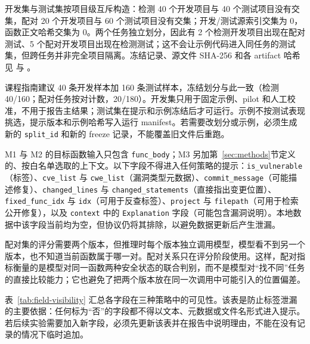 \documentclass[conference]{IEEEtran}
\begin{document}
开发集与测试集按项目级互斥构造：检测 40 个开发项目与 40 个测试项目没有交集，配对 20 个开发项目与 60 个测试项目没有交集；开发/测试源索引交集为 0，函数正文哈希交集为 0。两个任务独立划分，因此有 2 个检测开发项目出现在配对测试、5 个配对开发项目出现在检测测试；这不会让示例代码进入同任务的测试集，但跨任务并非完全项目隔离。冻结记录、源文件 SHA-256 和各 artifact 哈希见  与 。

课程指南建议 40 条开发样本加 160 条测试样本，冻结划分与此一致（检测 40/160；配对任务按对计数，20/180）。开发集只用于固定示例、pilot 和人工校准，不用于报告主结果；测试集在提示和示例冻结后才可运行。示例不按测试表现挑选，提示版本和示例哈希写入运行 manifest。若需要改划分或示例，必须生成新的 \texttt{split\_id} 和新的 freeze 记录，不能覆盖旧文件后重跑。

M1 与 M2 的目标函数输入只包含 \texttt{func\_body}；M3 另加第~\ref{sec:methods}节定义的、按白名单选取的上下文。以下字段不得进入任何策略的提示：\texttt{is\_vulnerable}（标签）、\texttt{cve\_list} 与 \texttt{cwe\_list}（漏洞类型元数据）、\texttt{commit\_message}（可能描述修复）、\texttt{changed\_lines} 与 \texttt{changed\_statements}（直接指出变更位置）、\texttt{fixed\_func\_idx} 与 \texttt{idx}（可用于反查标签）、\texttt{project} 与 \texttt{filepath}（可用于检索公开修复），以及 \texttt{context} 中的 \texttt{Explanation} 字段（可能包含漏洞说明）。本地数据中该字段当前均为空，但协议仍将其排除，以避免数据更新后产生泄漏。

配对集的评分需要两个版本，但推理时每个版本独立调用模型，模型看不到另一个版本，也不知道当前函数属于哪一对。配对关系只在评分阶段使用。这样，配对指标衡量的是模型对同一函数两种安全状态的联合判别，而不是模型对“找不同”任务的直接比较能力；它也避免了把两个版本放在同一次调用中可能引入的位置偏差。

表~\ref{tab:field-visibility} 汇总各字段在三种策略中的可见性。该表是防止标签泄漏的主要依据：任何标为“否”的字段都不得以文本、元数据或文件名形式进入提示。若后续实验需要加入新字段，必须先更新该表并在报告中说明理由，不能在没有记录的情况下临时追加。
\end{document}
